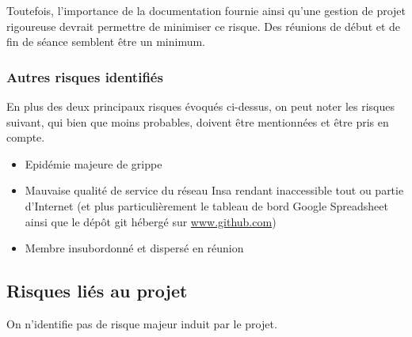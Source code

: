 Toutefois, l'importance de la documentation fournie ainsi qu'une gestion de
projet rigoureuse devrait permettre de minimiser ce risque. Des réunions de
début et de fin de séance semblent être un minimum.


\subsubsection{Autres risques identifiés}

En plus des deux principaux risques évoqués ci-dessus, on peut noter les
risques suivant, qui bien que moins probables, doivent être mentionnées et
être pris en compte.

\begin{itemize}

\item Epidémie majeure de grippe
\item Mauvaise qualité de service du réseau Insa rendant inaccessible tout
ou partie d'Internet (et plus particulièrement le tableau de bord Google
Spreadsheet ainsi que le dépôt git hébergé sur \url{www.github.com})
\item Membre insubordonné et dispersé en réunion

\end{itemize}

\subsection{Risques liés au projet}

On n'identifie pas de risque majeur induit par le projet.

\vfill
\pagebreak
